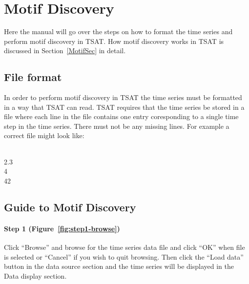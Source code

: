 \documentclass[letterpaper, 12pt]{article}
\newenvironment{allintypewriter}{\ttfamily}{\par}
\begin{document}
\section{Motif Discovery}
\label{MotifGuide}

Here the manual will go over the steps on how to format the time series and perform motif discovery in TSAT.  How motif discovery works in TSAT is discussed in Section~\ref{MotifSec} in detail.

\subsection{File format}

In order to perform motif discovery in TSAT the time series must be formatted in a way that TSAT can read.  TSAT requires that the time series be stored in a file where each line in the file contains one entry coresponding to a single time step in the time series.  There must not be any missing lines.  For example a correct file might look like:

\begin{allintypewriter}
	\\
	2.3\\
	4\\
	42\\
\end{allintypewriter}


\subsection{Guide to Motif Discovery}



\paragraph{Step 1 (Figure~\ref{fig:step1-browse})} Click ``Browse'' and browse for the time series data file and click ``OK'' when file is selected or ``Cancel'' if you wish to quit browsing.  Then click the ``Load data'' button in the data source section and the time series will be displayed in the Data display section.
\end{document}
